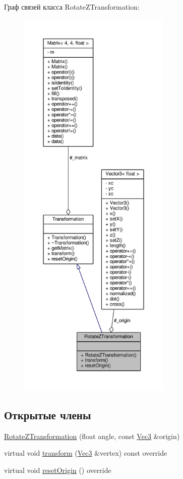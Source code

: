 Граф связей класса Rotate\+Z\+Transformation\+:
\nopagebreak
\begin{figure}[H]
\begin{center}
\leavevmode
\includegraphics[height=550pt]{d3/de9/class_rotate_z_transformation__coll__graph}
\end{center}
\end{figure}
\subsection*{Открытые члены}
\begin{DoxyCompactItemize}
\item 
\hyperlink{class_rotate_z_transformation_a27735a3fa38f846b5b2e643a9c5d1ba1}{Rotate\+Z\+Transformation} (float angle, const \hyperlink{vec3_8h_a221ad8ea4d9be4111628ee1ca22ee3ba}{Vec3} \&origin)
\item 
virtual void \hyperlink{class_rotate_z_transformation_a3f50084c9e113dde3ce12f57dda91d5b}{transform} (\hyperlink{vec3_8h_a221ad8ea4d9be4111628ee1ca22ee3ba}{Vec3} \&vertex) const override
\item 
virtual void \hyperlink{class_rotate_z_transformation_abae96c9cce0479c768e4c0ec80dd60f8}{reset\+Origin} () override
\end{DoxyCompactItemize}

